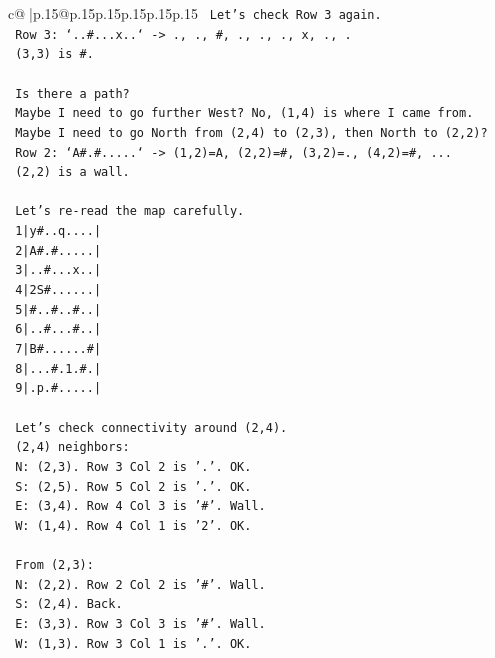 \documentclass{article}
\begin{document}
{\begin{supertabular}{c@{$\;$}|p{.15\linewidth}@{}p{.15\linewidth}p{.15\linewidth}p{.15\linewidth}p{.15\linewidth}p{.15\linewidth}}
{{{\texttt{   Let's check Row 3 again.} \\
\texttt{   Row 3: `..\#...x..` {-}> ., ., \#, ., ., ., x, ., .} \\
\texttt{   (3,3) is \#.} \\
\\ 
\texttt{   Is there a path?} \\
\texttt{   Maybe I need to go further West? No, (1,4) is where I came from.} \\
\texttt{   Maybe I need to go North from (2,4) to (2,3), then North to (2,2)?} \\
\texttt{   Row 2: `A\#.\#.....` {-}> (1,2)=A, (2,2)=\#, (3,2)=., (4,2)=\#, ...} \\
\texttt{   (2,2) is a wall.} \\
\\ 
\texttt{   Let's re{-}read the map carefully.} \\
\texttt{   1|y\#..q....|} \\
\texttt{   2|A\#.\#.....|} \\
\texttt{   3|..\#...x..|} \\
\texttt{   4|2S\#......|} \\
\texttt{   5|\#..\#..\#..|} \\
\texttt{   6|..\#...\#..|} \\
\texttt{   7|B\#......\#|} \\
\texttt{   8|...\#.1.\#.|} \\
\texttt{   9|.p.\#.....|} \\
\\ 
\texttt{   Let's check connectivity around (2,4).} \\
\texttt{   (2,4) neighbors:} \\
\texttt{   N: (2,3). Row 3 Col 2 is '.'. OK.} \\
\texttt{   S: (2,5). Row 5 Col 2 is '.'. OK.} \\
\texttt{   E: (3,4). Row 4 Col 3 is '\#'. Wall.} \\
\texttt{   W: (1,4). Row 4 Col 1 is '2'. OK.} \\
\\ 
\texttt{   From (2,3):} \\
\texttt{   N: (2,2). Row 2 Col 2 is '\#'. Wall.} \\
\texttt{   S: (2,4). Back.} \\
\texttt{   E: (3,3). Row 3 Col 3 is '\#'. Wall.} \\
\texttt{   W: (1,3). Row 3 Col 1 is '.'. OK.} \\
\\ 
}}}
\end{supertabular}}
\end{document}
